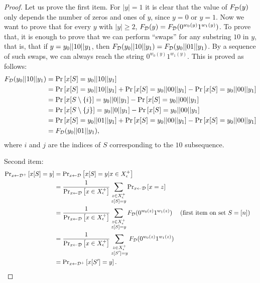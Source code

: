 \begin{proof}
   Let us prove the first item. For $|y| = 1$ it is clear that
   the value of $F_{\mathcal{D}}(y)$ only depends the number of zeros and ones of $y$, since
   $y = 0$ or $y = 1$.  Now we want to prove that for every $y$ with $|y| \geq 2$,
   $F_{\mathcal{D}}(y) = F_{\mathcal{D}}(0^{w_0(y)}1^{w_1(y)})$. To prove that, it is enough to prove that we
   can perform ``swaps'' for any substring $10$ in $y$, that is, that if $y = y_0 || 10 || y_1$,
   then $F_{\mathcal{D}}(y_0 || 10 || y_1) = F_{\mathcal{D}}(y_0 || 01 || y_1)$. By a sequence of such swaps, we can always reach the 
   string $0^{w_0(y)}1^{w_1(y)}$. This is proved as follows:  
   \begin{align*}
   F_{\mathcal{D}}(y_0 || 10 || y_1) & = \text{Pr}\left[x[S] = y_0 || 10 || y_1\right] \\
                                    & = \text{Pr}\left[x[S] = y_0 || 10 || y_1\right] 
                                    + \text{Pr}\left[x[S] = y_0 || 00 || y_1\right]
                                    - \text{Pr}\left[x[S] = y_0 || 00 || y_1\right] \\
                                    & = \text{Pr}\left[x[S \setminus \{i\}] = y_0 || 0 || y_1\right]
                                    - \text{Pr}\left[x[S] = y_0 || 00 || y_1\right] \\
                                    & = \text{Pr}\left[x[S \setminus \{j\}] = y_0 || 0 || y_1\right]
                                    - \text{Pr}\left[x[S] = y_0 || 00 || y_1\right] \\
                                    & = \text{Pr}\left[x[S] = y_0 || 01 || y_1\right] 
                                    + \text{Pr}\left[x[S] = y_0 || 00 || y_1\right]
                                    - \text{Pr}\left[x[S] = y_0 || 00 || y_1\right] \\
                                    & = F_{\mathcal{D}}(y_0 || 01 || y_1),
   \end{align*}
   where $i$ and $j$ are the indices of $S$ corresponding to the $10$ subsequence. 

Second item:
\begin{align*}
    \text{Pr}_{x \leftarrow \mathcal{D}^+}\left[x[S] = y\right] & = \text{Pr}_{x \leftarrow \mathcal{D}}\left[x[S] = y | x \in X^+_\epsilon\right] \\
        & = \frac{1}{\text{Pr}_{x \leftarrow \mathcal{D}}\left[x \in X^+_\epsilon\right]} \sum_{\substack{z\in X^+_\epsilon \\ z[S] = y}} \text{Pr}_{x \leftarrow \mathcal{D}}\left[x = z\right] \\
        & = \frac{1}{\text{Pr}_{x \leftarrow \mathcal{D}}\left[x \in X^+_\epsilon\right]} \sum_{\substack{z\in X^+_\epsilon \\ z[S] = y}} F_{\mathcal{D}}(0^{w_0(z)}1^{w_1(z)})
        && (\text{first item on set } S = [n])\\
        & = \frac{1}{\text{Pr}_{x \leftarrow \mathcal{D}}\left[x \in X^+_\epsilon\right]} \sum_{\substack{z\in X^+_\epsilon \\ z[S'] = y}} F_{\mathcal{D}}(0^{w_0(z)} 1^{w_1(z)}) \\
        & = \text{Pr}_{x \leftarrow \mathcal{D}^+}\left[x[S'] = y\right].
\end{align*}


\end{proof}
